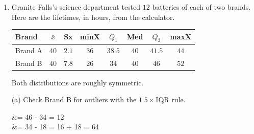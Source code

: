 \documentclass[10pt]{article}
\begin{document}
\begin{enumerate}[leftmargin=2.2em, itemsep=10pt, topsep=2pt, start=23]
(c) Next week every one of Maya's five scores is exactly $10$ pins higher.
New mean: \blankbox{\gradedblank[id=q24c, type=short, points=0.5, answer={194}, check=numeric]{1.6cm}{10pt}} \quad New standard deviation: \blankbox{\gradedblank[id=q24d, type=short, points=0.5, answer={3.2}, check=numeric, tolerance=0.05]{1.6cm}{10pt}}

\vspace{3pt}
Explain why the standard deviation came out that way.

\gradedresponse{\gradedblank[id=q24e, type=rubric, points=1, rubric=../rubrics/saar-u02-practice-test-q24e.yaml, display={Adding 10 to every score adds 10 to the mean, so not one deviation changes.}]{\linewidth}{2in}}

(d) Which bowler is more consistent? Justify with numbers.

\gradedresponse{\gradedblank[id=q24f, type=rubric, points=2, rubric=../rubrics/saar-u02-practice-test-q24f.yaml, display={Maya: $s \approx 3.2$ pins against Jordan's 24.7, so her games stay close together.}]{\linewidth}{2in}}

\boxguard[30]
\item Granite Falls's science department tested $12$ batteries of each of two brands. Here
are the lifetimes, in hours, from the calculator.

\vspace{3pt}
\renewcommand{\arraystretch}{1.25}
\begin{tabularx}{\linewidth}{@{} X *{7}{c} @{}}
\rowcolor{frost}
\textbf{Brand} & $\bar{x}$ & \textbf{Sx} & \textbf{minX} & $Q_1$ & \textbf{Med} & $Q_3$ &
  \textbf{maxX} \\
\midrule
Brand A & $40$ & $2.1$ & $36$ & $38.5$ & $40$ & $41.5$ & $44$ \\
Brand B & $40$ & $7.8$ & $26$ & $34$ & $40$ & $46$ & $52$ \\
\end{tabularx}

\vspace{4pt}
Both distributions are roughly symmetric.

\vspace{3pt}
(a) Check Brand B for outliers with the $1.5 \times \text{IQR}$ rule.

\begin{work}
   &= 46 - 34 = 12 \\
   &= 34 - 18 = 16 \quad{} + 18 = 64
\end{work}


\end{enumerate}
\end{document}
